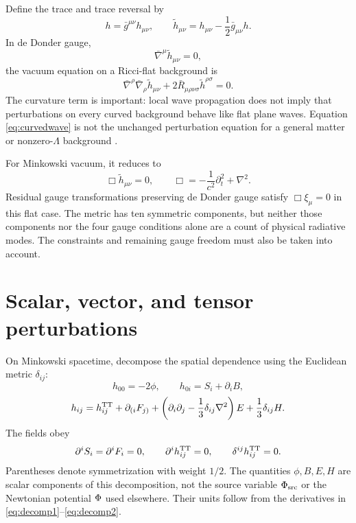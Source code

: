 \documentclass[11pt]{article}
\begin{document}
Define the trace and trace reversal by
\begin{equation}
h=\bar g^{\mu\nu}h_{\mu\nu},\qquad
\widetilde h_{\mu\nu}=h_{\mu\nu}-\frac12\bar g_{\mu\nu}h.
\label{eq:tracereverse}
\end{equation}
In de Donder gauge,
\begin{equation}
\bar\nabla^\mu\widetilde h_{\mu\nu}=0,
\label{eq:dedonder}
\end{equation}
the vacuum equation on a Ricci-flat background is
\begin{equation}
\bar\nabla^\rho\bar\nabla_\rho\widetilde h_{\mu\nu}
+2\bar R_{\mu\rho\nu\sigma}\widetilde h^{\rho\sigma}=0.
\label{eq:curvedwave}
\end{equation}
The curvature term is important: local wave propagation does not imply that perturbations on every curved background behave like flat plane waves. Equation \eqref{eq:curvedwave} is not the unchanged perturbation equation for a general matter or nonzero-$\Lambda$ background \parencite{Carroll1997,Gourgoulhon2007}.

For Minkowski vacuum, it reduces to
\begin{equation}
\Box\widetilde h_{\mu\nu}=0,\qquad
\Box=-\frac{1}{c^2}\partial_t^2+\nabla^2.
\label{eq:minkwave}
\end{equation}
Residual gauge transformations preserving de Donder gauge satisfy $\Box\xi_\mu=0$ in this flat case. The metric has ten symmetric components, but neither those components nor the four gauge conditions alone are a count of physical radiative modes. The constraints and remaining gauge freedom must also be taken into account.

\section{Scalar, vector, and tensor perturbations}
On Minkowski spacetime, decompose the spatial dependence using the Euclidean metric $\delta_{ij}$:
\begin{equation}
h_{00}=-2\phi,\qquad h_{0i}=S_i+\partial_i B,
\label{eq:decomp1}
\end{equation}
\begin{equation}
h_{ij}=h^{\mathrm{TT}}_{ij}+\partial_{(i}F_{j)}+
\left(\partial_i\partial_j-\frac13\delta_{ij}\nabla^2\right)E
+\frac13\delta_{ij}H.
\label{eq:decomp2}
\end{equation}
The fields obey
\begin{equation}
\partial^iS_i=\partial^iF_i=0,\qquad
\partial^ih^{\mathrm{TT}}_{ij}=0,\qquad \delta^{ij}h^{\mathrm{TT}}_{ij}=0.
\label{eq:ttconditions}
\end{equation}
Parentheses denote symmetrization with weight $1/2$. The quantities $\phi,B,E,H$ are scalar components of this decomposition, not the source variable $\Phi_{\mathrm{src}}$ or the Newtonian potential $\Phi$ used elsewhere. Their units follow from the derivatives in \eqref{eq:decomp1}--\eqref{eq:decomp2}.
\end{document}
